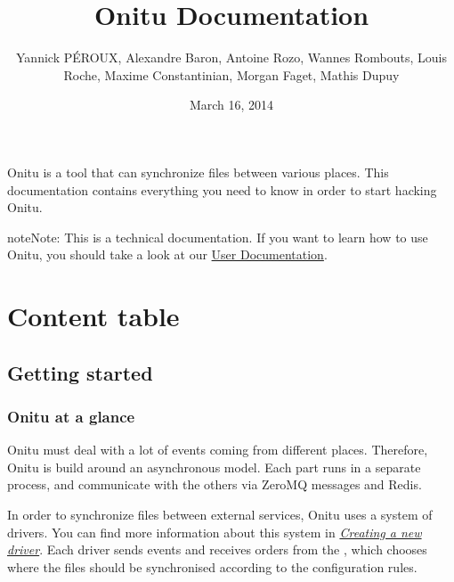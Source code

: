 \documentclass[letterpaper,10pt,english]{sphinxmanual}
\title{Onitu Documentation}
\date{March 16, 2014}
\author{Yannick PÉROUX, Alexandre Baron, Antoine Rozo, Wannes Rombouts, Louis Roche, Maxime Constantinian, Morgan Faget, Mathis Dupuy}
\begin{document}
\maketitle
\tableofcontents
{}\label{index::doc}


Onitu is a tool that can synchronize files between various places. This documentation contains everything you need to know in order to start hacking Onitu.

\begin{notice}{note}{Note:}
This is a technical documentation. If you want to learn how to use Onitu, you should take a look at our \href{http://github.com/onitu/onitu}{User Documentation}.
\end{notice}


\chapter{Content table}
\label{index:onitu-version-technical-documentation}\label{index:content-table}\label{index:user-documentation}

\section{Getting started}
\label{intro:getting-started}\label{intro::doc}

\subsection{Onitu at a glance}
\label{intro:onitu-at-a-glance}
Onitu must deal with a lot of events coming from different places. Therefore, Onitu is build around an asynchronous model. Each part runs in a separate process, and communicate with the others via ZeroMQ messages and Redis.

In order to synchronize files between external services, Onitu uses a system of drivers. You can find more information about this system in {\hyperref[drivers::doc]{\emph{Creating a new driver}}}. Each driver sends events and receives orders from the {\hyperref[components:onitu.referee.Referee]{}}, which chooses where the files should be synchronised according to the configuration rules.
\end{document}

